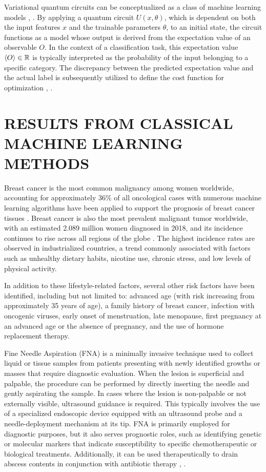 \documentclass[en]{dimscthesis}
\begin{document}
Variational quantum circuits can be conceptualized as a class of machine learning models \cite{bib:schuld_petruccione}, \cite{bib:VQA}. By applying a quantum circuit $U(x, \theta)$, which is dependent on both the input features $x$ and the trainable parameters $\theta$, to an initial state, the circuit functions as a model whose output is derived from the expectation value of an observable $O$. In the context of a classification task, this expectation value $\braket{O} \in \mathbb{R}$ is typically interpreted as the probability of the input belonging to a specific category. The discrepancy between the predicted expectation value and the actual label is subsequently utilized to define the cost function for optimization \cite{bib:Schuld_2020}, \cite{bib:VQA}.

\chapter{RESULTS FROM CLASSICAL MACHINE LEARNING METHODS} \label{mlres}

Breast cancer is the most common malignancy among women worldwide, accounting for approximately 36\% of all oncological cases \cite{bib:cancer} with numerous machine learning algorithms have been applied to support the prognosis of breast cancer tissues \cite{bib:cancer_prognosis}. Breast cancer is also the most prevalent malignant tumor worldwide, with an estimated 2.089 million women diagnosed in 2018, and its incidence continues to rise across all regions of the globe \cite{bib:cancer}. The highest incidence rates are observed in industrialized countries, a trend commonly associated with factors such as unhealthy dietary habits, nicotine use, chronic stress, and low levels of physical activity.

In addition to these lifestyle-related factors, several other risk factors have been identified, including but not limited to: advanced age (with risk increasing from approximately 35 years of age), a family history of breast cancer, infection with oncogenic viruses, early onset of menstruation, late menopause, first pregnancy at an advanced age or the absence of pregnancy, and the use of hormone replacement therapy.

Fine Needle Aspiration (FNA) is a minimally invasive technique used to collect liquid or tissue samples from patients presenting with newly identified growths or masses that require diagnostic evaluation. When the lesion is superficial and palpable, the procedure can be performed by directly inserting the needle and gently aspirating the sample. In cases where the lesion is non-palpable or not externally visible, ultrasound guidance is required. This typically involves the use of a specialized endoscopic device equipped with an ultrasound probe and a needle-deployment mechanism at its tip. FNA is primarily employed for diagnostic purposes, but it also serves prognostic roles, such as identifying genetic or molecular markers that indicate susceptibility to specific chemotherapeutic or biological treatments. Additionally, it can be used therapeutically to drain abscess contents in conjunction with antibiotic therapy \cite{bib:FNA}, \cite{bib:fine_needle}.
\end{document}
